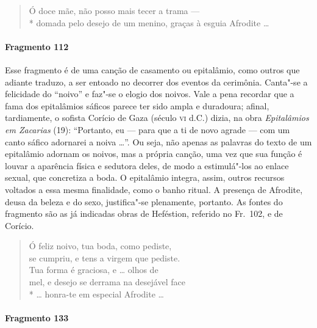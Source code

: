 \begin{verse}
Ó doce mãe, não posso mais tecer a trama --- \\*
domada pelo desejo de um menino, graças à esguia Afrodite \ldots{}
\end{verse}


\paragraph{Fragmento 112}

{\small Esse fragmento é de uma canção de casamento ou epitalâmio, como outros que
adiante traduzo, a ser entoado no decorrer dos eventos da cerimônia.
Canta"-se a felicidade do ``noivo” e faz"-se o elogio
dos noivos. Vale a pena recordar que a fama dos epitalâmios sáficos parece ter
sido ampla e duradoura; afinal, tardiamente, o sofista Corício de Gaza (século
\textsc{vi} d.C.) dizia, na obra \textit{Epitalâmios em Zacarias} (19): ``Portanto, eu
--- para que a ti de novo agrade --- com um canto sáfico adornarei a noiva \ldots{}”.
Ou seja, não apenas as palavras do texto de um epitalâmio adornam os noivos,
mas a própria canção, uma vez que sua função é louvar a aparência física e
sedutora deles, de modo a estimulá"-los ao enlace sexual, que concretiza a
boda. O epitalâmio integra, assim, outros recursos voltados a essa mesma finalidade,
como o banho ritual. A presença de Afrodite, deusa da beleza e do sexo,
justifica"-se plenamente, portanto. As fontes do fragmento são as já indicadas
obras de Heféstion, referido no Fr.~102, e de Corício.}

\begin{verse}
Ó feliz noivo, tua boda, como pediste,\\
se cumpriu, e tens a virgem que pediste.\\
Tua forma é graciosa, e \ldots{} olhos de\\
mel, e desejo se derrama na desejável face\\*
\ldots{} honra-te em especial Afrodite \ldots{}
\end{verse}

\paragraph{Fragmento 133}

